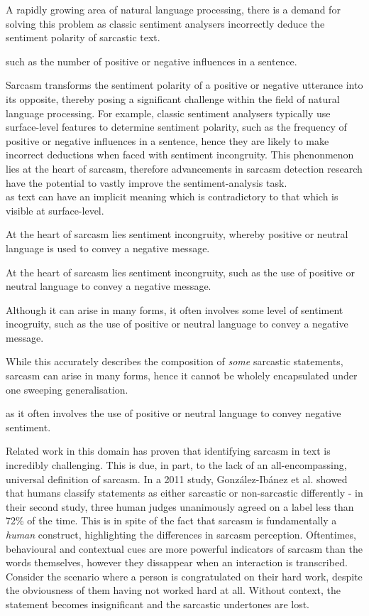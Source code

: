 \documentclass[12pt,a4paper]{article}
\begin{document}
A rapidly growing area of natural language processing, there is a demand for solving this problem as classic sentiment analysers incorrectly deduce the sentiment polarity of sarcastic text.

such as the number of positive or negative influences in a sentence. 

Sarcasm transforms the sentiment polarity of a positive or negative utterance into its opposite, thereby posing a significant challenge within the field of natural language processing. For example, classic sentiment analysers typically use surface-level features to determine sentiment polarity, such as the frequency of positive or negative influences in a sentence, hence they are likely to make incorrect deductions when faced with sentiment incongruity. This phenonmenon lies at the heart of sarcasm, therefore advancements in sarcasm detection research have the potential to vastly improve the sentiment-analysis task.\\






as text can have an implicit meaning which is contradictory to that which is visible at surface-level.



At the heart of sarcasm lies sentiment incongruity, whereby positive or neutral language is used to convey a negative message.

At the heart of sarcasm lies sentiment incongruity, such as the use of positive or neutral language to convey a negative message.

Although it can arise in many forms, it often involves some level of sentiment incogruity, such as the use of positive or neutral language to convey a negative message.

While this accurately describes the composition of \textit{some} sarcastic statements, sarcasm can arise in many forms, hence it cannot be wholely encapsulated under one sweeping generalisation. 


 as it often involves the use of positive or neutral language to convey negative sentiment.



\noindent Related work in this domain has proven that identifying sarcasm in text is incredibly challenging. This is due, in part, to the lack of an all-encompassing, universal definition of sarcasm. In a 2011 study, Gonz{\'a}lez-Ib{\'a}nez et al. \cite{gonzalez2011identifying} showed that humans  classify statements as either sarcastic or non-sarcastic differently - in their second study, three human judges unanimously agreed on a label less than 72\% of the time. This is in spite of the fact that sarcasm is fundamentally a \textit{human} construct, highlighting the differences in sarcasm perception. Oftentimes, behavioural and contextual cues are more powerful indicators of sarcasm than the words themselves, however they dissappear when an interaction is transcribed. Consider the scenario where a person is congratulated on their hard work, despite the obviousness of them having not worked hard at all. Without context, the statement becomes insignificant and the sarcastic undertones are lost. \\
\end{document}
